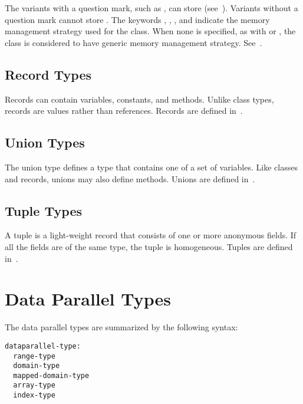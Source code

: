 The variants with a question mark, such as , can store
 (see~). Variants without a question mark
cannot store . The keywords , ,
, and  indicate the memory management
strategy used for the class. When none is specified, as with  or
, the class is considered to have generic memory management
strategy. See~.

\subsection{Record Types}
\label{Types_Record_Types}

Records can contain variables, constants, and methods. Unlike class
types, records are values rather than references. Records are defined
in~.

\subsection{Union Types}
\label{Types_Union_Types}

The union type defines a type that contains one of a set of variables.
Like classes and records, unions may also define methods.  Unions are
defined in~.

\subsection{Tuple Types}
\label{Types_Tuple_Types}

A tuple is a light-weight record that consists of one or more
anonymous fields.  If all the fields are of the same type, the tuple
is homogeneous.  Tuples are defined in~.

\clearpage
\section{Data Parallel Types}
\label{Data_Parallel_Types}

The data parallel types are summarized by the following syntax:

\begin{syntax}
\begin{verbatim}
dataparallel-type:
  range-type
  domain-type
  mapped-domain-type
  array-type
  index-type
\end{verbatim}
\end{syntax}

